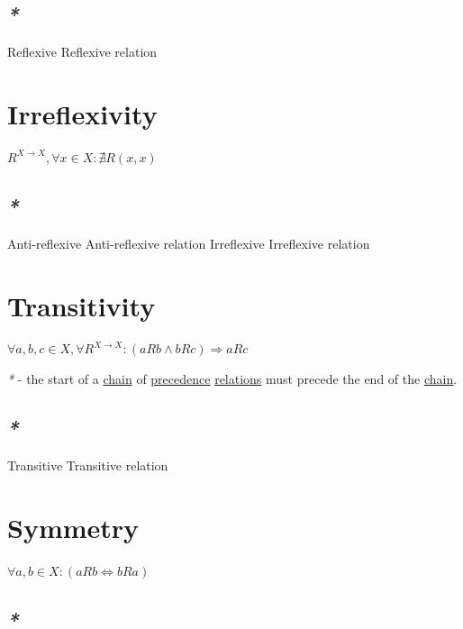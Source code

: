 \documentclass[a4paper,14pt,oneside]{book}
\begin{document}
\subsection{\emph{*}}
\label{sec:org523a04f}

\label{orgcf841cc}Reflexive
\label{org31a707d}Reflexive relation

\section{\label{orga45a3c4}Irreflexivity}
\label{sec:org38b3736}

\(R^{X \to X}, \forall x \in X : \nexists R(x, x)\)

\subsection{\emph{*}}
\label{sec:org7740216}

\label{org84acb6b}Anti-reflexive
\label{org0210fad}Anti-reflexive relation
\label{org69f02e4}Irreflexive
\label{orgc8faf56}Irreflexive relation

\section{\label{orgeaaf54f}Transitivity}
\label{sec:org9e77948}

\(\forall a,b,c \in X, \forall R^{X \to X} : (aRb \land bRc) \Rightarrow aRc\)

\emph{*} - the start of a \hyperref[orgfc82892]{chain} of \hyperref[org61b7d9a]{precedence} \hyperref[org6c914a7]{relations} must precede the end of the \hyperref[orgfc82892]{chain}.

\subsection{\emph{*}}
\label{sec:orga5dba24}

\label{orgb61ecd1}Transitive
\label{org812d09c}Transitive relation

\section{\label{org18d03f7}Symmetry}
\label{sec:orgc668ae6}

\(\forall a,b \in X : (aRb \iff bRa)\)

\subsection{\emph{*}}
\label{sec:orgb44fd03}
\end{document}
